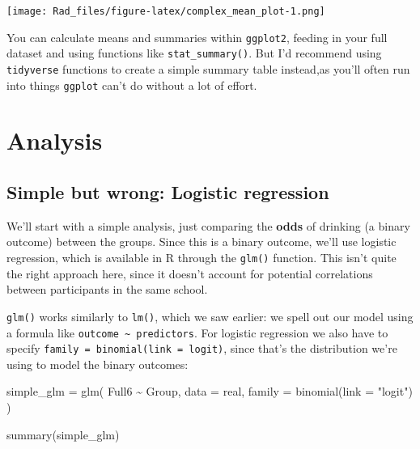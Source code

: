 \documentclass[
]{book}
\newenvironment{Shaded}{\begin{snugshade}}{\end{snugshade}}
\newcommand{\AttributeTok}[1]{\textcolor[rgb]{0.77,0.63,0.00}{#1}}
\newcommand{\FunctionTok}[1]{\textcolor[rgb]{0.00,0.00,0.00}{#1}}
\newcommand{\NormalTok}[1]{#1}
\newcommand{\OtherTok}[1]{\textcolor[rgb]{0.56,0.35,0.01}{#1}}
\newcommand{\SpecialCharTok}[1]{\textcolor[rgb]{0.00,0.00,0.00}{#1}}
\newcommand{\StringTok}[1]{\textcolor[rgb]{0.31,0.60,0.02}{#1}}
\begin{document}
\texttt{[image: Rad\_files/figure-latex/complex\_mean\_plot-1.png]}

\begin{note}
You can calculate means and summaries within \texttt{ggplot2}, feeding
in your full dataset and using functions like \texttt{stat\_summary()}.
But I'd recommend using \texttt{tidyverse} functions to create a simple
summary table instead,as you'll often run into things \texttt{ggplot}
can't do without a lot of effort.
\end{note}

\hypertarget{analysis-1}{%
\section{Analysis}\label{analysis-1}}

\hypertarget{simple-but-wrong-logistic-regression}{%
\subsection{Simple but wrong: Logistic regression}\label{simple-but-wrong-logistic-regression}}

We'll start with a simple analysis, just comparing
the \textbf{odds} of drinking (a binary outcome) between
the groups. Since this is a binary outcome,
we'll use logistic regression, which is available
in R through the \texttt{glm()} function. This isn't quite
the right approach here, since it doesn't account
for potential correlations between participants in
the same school.

\texttt{glm()} works similarly to \texttt{lm()}, which we saw earlier:
we spell out our model using a formula like \texttt{outcome\ \textasciitilde{}\ predictors}.
For logistic regression we also have to specify
\texttt{family\ =\ binomial(link\ =\ \textquotesingle{}logit\textquotesingle{})}, since that's the distribution
we're using to model the binary outcomes:

\begin{Shaded}
\begin{Highlighting}[]
\NormalTok{simple\_glm }\OtherTok{=} \FunctionTok{glm}\NormalTok{(}
\NormalTok{  Full6 }\SpecialCharTok{\textasciitilde{}}\NormalTok{ Group,}
  \AttributeTok{data =}\NormalTok{ real,}
  \AttributeTok{family =} \FunctionTok{binomial}\NormalTok{(}\AttributeTok{link =} \StringTok{"logit"}\NormalTok{)}
\NormalTok{)}

\FunctionTok{summary}\NormalTok{(simple\_glm)}
\end{Highlighting}
\end{Shaded}
\end{document}
